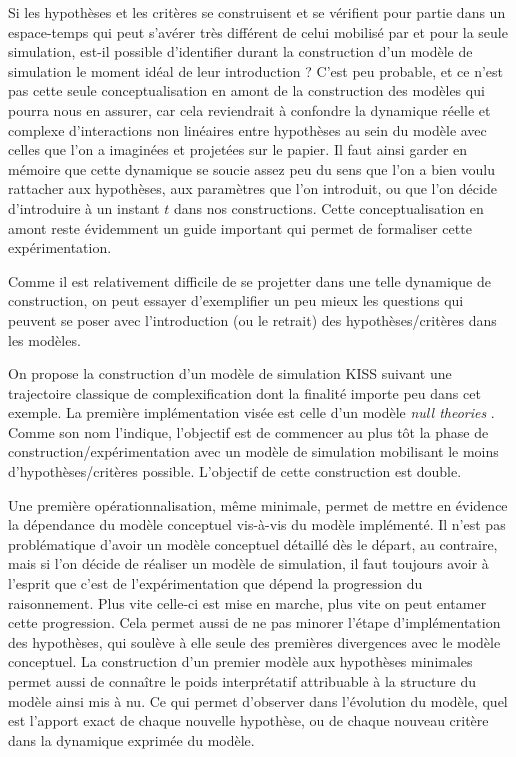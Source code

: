 Si les hypothèses et les critères se construisent et se vérifient pour partie dans un espace-temps qui peut s'avérer très différent de celui mobilisé par et pour la seule simulation, est-il possible d'identifier durant la construction d'un modèle de simulation le moment idéal de leur introduction ? C'est peu probable, et ce n'est pas cette seule conceptualisation en amont de la construction des modèles qui pourra nous en assurer, car cela reviendrait à confondre la dynamique réelle et complexe d'interactions non linéaires entre hypothèses au sein du modèle avec celles que l'on a imaginées et projetées sur le papier. Il faut ainsi garder en mémoire que cette dynamique se soucie assez peu du sens que l'on a bien voulu rattacher aux hypothèses, aux paramètres que l'on introduit, ou que l'on décide d'introduire à un instant $t$ dans nos constructions. Cette conceptualisation en amont reste évidemment un guide important qui permet de formaliser cette expérimentation.

Comme il est relativement difficile de se projetter dans une telle dynamique de construction, on peut essayer d'exemplifier un peu mieux les questions qui peuvent se poser avec l'introduction (ou le retrait) des hypothèses/critères dans les modèles.

On propose la construction d'un modèle de simulation KISS suivant une trajectoire classique de complexification dont la finalité importe peu dans cet exemple. La première implémentation visée est celle d'un modèle \textit{null theories} \textcite{Railsback2012}. Comme son nom l'indique, l'objectif est de commencer au plus tôt la phase de construction/expérimentation avec un modèle de simulation mobilisant le moins d'hypothèses/critères possible. L'objectif de cette construction est double.

Une première opérationnalisation, même minimale, permet de mettre en évidence la dépendance du modèle conceptuel vis-à-vis du modèle implémenté. Il n'est pas problématique d'avoir un modèle conceptuel détaillé dès le départ, au contraire, mais si l'on décide de réaliser un modèle de simulation, il faut toujours avoir à l'esprit que c'est de l'expérimentation que dépend la progression du raisonnement. Plus vite celle-ci est mise en marche, plus vite on peut entamer cette progression. Cela permet aussi de ne pas minorer l'étape d'implémentation des hypothèses, qui soulève à elle seule des premières divergences avec le modèle conceptuel. La construction d'un premier modèle aux hypothèses minimales permet aussi de connaître le poids interprétatif attribuable à la structure du modèle ainsi mis à nu. Ce qui permet d’observer dans l’évolution du modèle, quel est l’apport exact de chaque nouvelle hypothèse, ou de chaque nouveau critère dans la dynamique exprimée du modèle.


